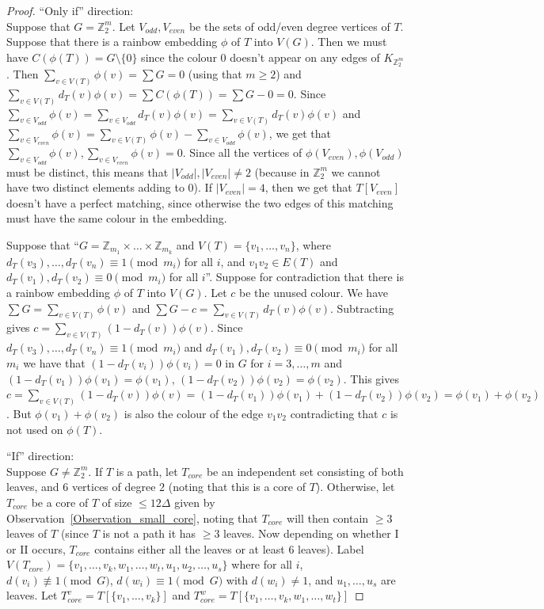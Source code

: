 \documentclass[a4paper,11pt,hidelinks]{amsart}
\theoremstyle{definition}
\begin{document}
\begin{proof}

``Only if'' direction:\\
Suppose that $G=\mathbb{Z}_2^m$. Let $V_{odd}, V_{even}$ be the sets of odd/even degree vertices of $T$.
Suppose that there is a rainbow embedding $\phi$ of $T$ into $V(G)$. Then we must have $C(\phi(T))=G\setminus \{0\}$ since the colour $0$ doesn't appear on any edges of $K_{\mathbb{Z}_2^m}$.
Then $\sum_{v\in V(T)}\phi(v)=\sum G=0$ (using that $m\geq 2$) and $\sum_{v\in V(T)}d_T(v)\phi(v)=\sum C(\phi(T))=\sum G-0=0$. Since $\sum_{v\in V_{odd}}\phi(v)=\sum_{v\in V_{odd}}d_T(v)\phi(v)=\sum_{v\in V(T)}d_T(v)\phi(v)$ and $\sum_{v\in V_{even}}\phi(v)= \sum_{v\in V(T)}\phi(v)-\sum_{v\in V_{odd}}\phi(v)$, we get that $\sum_{v\in V_{odd}}\phi(v), \sum_{v\in V_{even}}\phi(v)=0$. Since all the vertices of $\phi(V_{even}), \phi(V_{odd})$ must be distinct, this means that $|V_{odd}|, |V_{even}|\neq 2$ (because in $\mathbb{Z}_2^m$ we cannot have two distinct elements adding to $0$). If $|V_{even}|=4$, then we get that $T[V_{even}] $ doesn't have a perfect matching, since otherwise the two edges of this matching must have the same colour in the embedding.


Suppose that ``$G=\mathbb{Z}_{m_1}\times\dots \times \mathbb{Z}_{m_k}$ and $V(T)=\{v_1, \dots, v_n\}$, where $d_T(v_3), \dots, d_T(v_n)\equiv 1\pmod {m_i}$ for all $i$, and $v_1v_2\in E(T)$ and $d_T(v_1), d_T(v_2)\equiv 0\pmod {m_i}$ for all $i$''.
Suppose for contradiction that there is a rainbow embedding $\phi$ of $T$ into $V(G)$. Let $c$ be the unused colour. We have $\sum G=\sum_{v\in V(T)} \phi(v)$ and $\sum G-c=\sum_{v\in V(T)} d_T(v)\phi(v)$. Subtracting gives $c=\sum_{v\in V(T)} (1-d_T(v))\phi(v)$. Since $d_T(v_3), \dots, d_T(v_n)\equiv 1\pmod {m_i}$ and $d_T(v_1), d_T(v_2)\equiv 0\pmod {m_i}$ for all $m_i$ we have that $(1-d_T(v_i))\phi(v_i)=0$ in $G$ for $i=3, \dots, m$ and $(1-d_T(v_1))\phi(v_1)=\phi(v_1)$, $(1-d_T(v_2))\phi(v_2)=\phi(v_2)$.
 This gives  $c=\sum_{v\in V(T)} (1-d_T(v))\phi(v)=(1-d_T(v_1))\phi(v_1)+(1-d_T(v_2))\phi(v_2)=\phi(v_1)+\phi(v_2)$. But $\phi(v_1)+\phi(v_2)$ is also the colour of the edge $v_1v_2$ contradicting that $c$ is not used on $\phi(T)$.




``If'' direction:\\
Suppose $G\neq \mathbb{Z}_2^m$. If $T$ is a path, let $T_{core}$  be an independent set consisting  of both leaves, and $6$ vertices of degree $2$ (noting that this is a core of $T$). Otherwise, let  $T_{core}$ be a core of $T$ of size $\leq 12\Delta$ given by Observation~\ref{Observation_small_core}, noting that $T_{core}$ will then contain $\geq 3$ leaves of $T$ (since $T$ is not a path it has $\geq 3$ leaves. Now depending on whether I or II occurs, $T_{core}$ contains either all the leaves or at least $6$  leaves). Label $V(T_{core})=\{v_1, \dots, v_k, w_1, \dots, w_t, u_1, u_2, \dots, u_s\}$ where
for all $i$, $d(v_i)\not\equiv 1 \pmod G$,  $d(w_i)\equiv 1 \pmod G$ with $d(w_i)\neq 1$, and $u_1, \dots, u_s$ are leaves.  
Let $T_{core}^{v}=T[\{v_{1}, \dots, v_k\}]$ and
$T_{core}^{w}=T[\{v_{1}, \dots, v_k, w_1, \dots, w_t\}]$


\end{proof}
\end{document}
